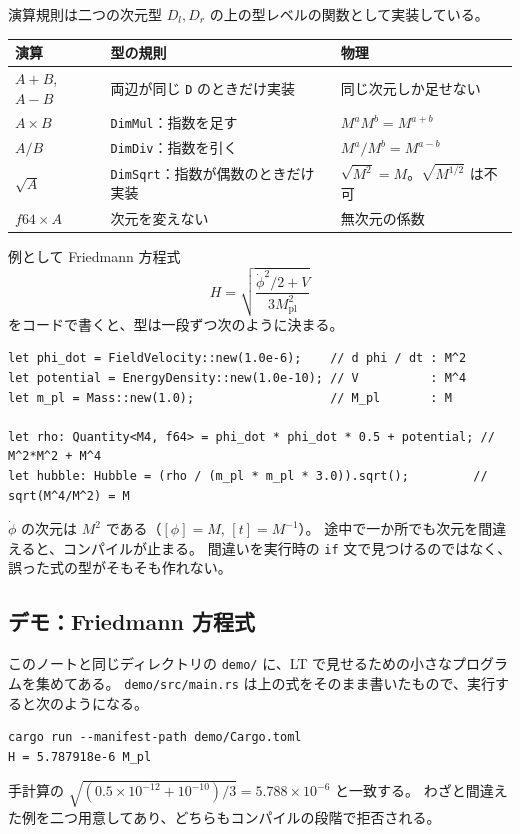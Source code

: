 \documentclass[a4paper,11pt]{ltjsarticle}
\newcommand{\Mpl}{M_{\mathrm{pl}}}
\newcommand{\code}[1]{\texttt{#1}}
\begin{document}
演算規則は二つの次元型 $D_l, D_r$ の上の型レベルの関数として実装している。

\begin{center}
\begin{tabular}{lll}
\toprule
演算 & 型の規則 & 物理 \\
\midrule
$A+B$, $A-B$ & 両辺が同じ \code{D} のときだけ実装 & 同じ次元しか足せない \\
$A\times B$ & \code{DimMul}：指数を足す & $M^aM^b=M^{a+b}$ \\
$A/B$ & \code{DimDiv}：指数を引く & $M^a/M^b=M^{a-b}$ \\
$\sqrt{A}$ & \code{DimSqrt}：指数が偶数のときだけ実装 & $\sqrt{M^{2}}=M$。$\sqrt{M^{1/2}}$ は不可 \\
$f64\times A$ & 次元を変えない & 無次元の係数 \\
\bottomrule
\end{tabular}
\end{center}

例として Friedmann 方程式
\[
H=\sqrt{\frac{\dot\phi^2/2+V}{3\Mpl^2}}
\]
をコードで書くと、型は一段ずつ次のように決まる。
\begin{lstlisting}
let phi_dot = FieldVelocity::new(1.0e-6);    // d phi / dt : M^2
let potential = EnergyDensity::new(1.0e-10); // V          : M^4
let m_pl = Mass::new(1.0);                   // M_pl       : M

let rho: Quantity<M4, f64> = phi_dot * phi_dot * 0.5 + potential; // M^2*M^2 + M^4
let hubble: Hubble = (rho / (m_pl * m_pl * 3.0)).sqrt();         // sqrt(M^4/M^2) = M
\end{lstlisting}
$\dot\phi$ の次元は $M^2$ である（$[\phi]=M$, $[t]=M^{-1}$）。
途中で一か所でも次元を間違えると、コンパイルが止まる。
間違いを実行時の \code{if} 文で見つけるのではなく、誤った式の型がそもそも作れない。

\subsection{デモ：Friedmann 方程式}
\label{sec:demo}

このノートと同じディレクトリの \code{demo/} に、LT で見せるための小さなプログラムを集めてある。
\code{demo/src/main.rs} は上の式をそのまま書いたもので、実行すると次のようになる。
\begin{lstlisting}[language={}]
cargo run --manifest-path demo/Cargo.toml
H = 5.787918e-6 M_pl
\end{lstlisting}
手計算の $\sqrt{(0.5\times10^{-12}+10^{-10})/3}=5.788\times10^{-6}$ と一致する。
わざと間違えた例を二つ用意してあり、どちらもコンパイルの段階で拒否される。
\end{document}
